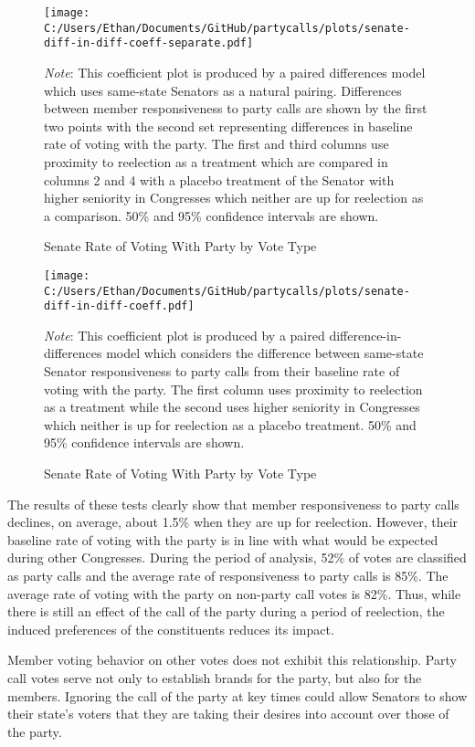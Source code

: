 \documentclass[12pt]{article}
\newcommand\fnote[1]{\captionsetup{font=small}\caption*{#1}}
\begin{document}
\begin{figure}[H]
	\centering
	\caption{Senate Rate of Voting With Party by Vote Type}
	\texttt{[image: C:/Users/Ethan/Documents/GitHub/partycalls/plots/senate-diff-in-diff-coeff-separate.pdf]}
	\fnote{\textit{Note}: This coefficient plot is produced by a paired differences model which uses same-state Senators as a natural pairing. Differences between member responsiveness to party calls are shown by the first two points with the second set representing differences in baseline rate of voting with the party. The first and third columns use proximity to reelection as a treatment which are compared in columns 2 and 4 with a placebo treatment of the Senator with higher seniority in Congresses which neither are up for reelection as a comparison. 50\% and 95\% confidence intervals are shown.}
\end{figure}

\begin{figure}[H]
	\centering
	\caption{Senate Rate of Voting With Party by Vote Type}
	\texttt{[image: C:/Users/Ethan/Documents/GitHub/partycalls/plots/senate-diff-in-diff-coeff.pdf]}
	\fnote{\textit{Note}: This coefficient plot is produced by a paired difference-in-differences model which considers the difference between same-state Senator responsiveness to party calls from their baseline rate of voting with the party. The first column uses proximity to reelection as a treatment while the second uses higher seniority in Congresses which neither is up for reelection as a placebo treatment. 50\% and 95\% confidence intervals are shown.}
\end{figure}

The results of these tests clearly show that member responsiveness to party calls declines, on average, about 1.5\% when they are up for reelection. However, their baseline rate of voting with the party is in line with what would be expected during other Congresses. During the period of analysis, 52\% of votes are classified as party calls and the average rate of responsiveness to party calls is 85\%. The average rate of voting with the party on non-party call votes is 82\%. Thus, while there is still an effect of the call of the party during a period of reelection, the induced preferences of the constituents reduces its impact.

Member voting behavior on other votes does not exhibit this relationship. Party call votes serve not only to establish brands for the party, but also for the members. Ignoring the call of the party at key times could allow Senators to show their state's voters that they are taking their desires into account over those of the party. 
\end{document}
